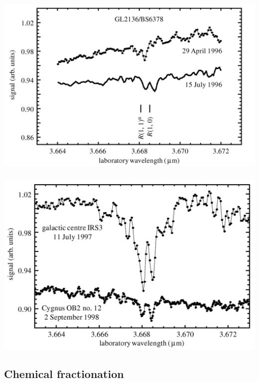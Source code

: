 \begin{frame}
\end{frame} \begin{frame}\frametitle{}
\begin{center}
  \includegraphics[width=\textwidth,height=!]{./B/h3_discspec.jpg}
\end{center}

\end{frame} \begin{frame}\frametitle{}
\begin{center}
  \includegraphics[width=\textwidth,height=!]{./B/h3_other.jpg}
\end{center}


\end{frame}

\subsection{Chemical fractionation}

